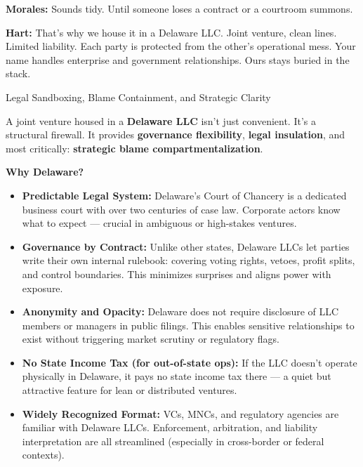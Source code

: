 \medskip

\textbf{Morales:}
Sounds tidy. Until someone loses a contract or a courtroom summons.

\textbf{Hart:}
That's why we house it in a Delaware LLC.
Joint venture, clean lines. Limited liability.
Each party is protected from the other’s operational mess.
Your name handles enterprise and government relationships.
Ours stays buried in the stack.

\medskip

\begin{TechnicalSidebar}{Legal Sandboxing, Blame Containment, and Strategic Clarity}

  A joint venture housed in a \textbf{Delaware LLC} isn’t just convenient. It’s a structural firewall.  
  It provides \textbf{governance flexibility}, \textbf{legal insulation}, and most critically: \textbf{strategic blame 
  compartmentalization}.
  
  \medskip
  
  \textbf{Why Delaware?}

  \medskip
  
  \begin{itemize}
    \item \textbf{Predictable Legal System:}  
    Delaware’s Court of Chancery is a dedicated business court with over two centuries of case law. Corporate actors 
    know what to expect — crucial in ambiguous or high-stakes ventures.
  
    \item \textbf{Governance by Contract:}  
    Unlike other states, Delaware LLCs let parties write their own internal rulebook: covering voting rights, vetoes, 
    profit splits, and control boundaries. This minimizes surprises and aligns power with exposure.
  
    \item \textbf{Anonymity and Opacity:}  
    Delaware does not require disclosure of LLC members or managers in public filings. This enables sensitive relationships 
    to exist without triggering market scrutiny or regulatory flags.
  
    \item \textbf{No State Income Tax (for out-of-state ops):}  
    If the LLC doesn’t operate physically in Delaware, it pays no state income tax there — a quiet but attractive feature 
    for lean or distributed ventures.
  
    \item \textbf{Widely Recognized Format:}  
    VCs, MNCs, and regulatory agencies are familiar with Delaware LLCs. Enforcement, arbitration, and liability 
    interpretation are all streamlined (especially in cross-border or federal contexts).
  \end{itemize}
  

\end{TechnicalSidebar}
